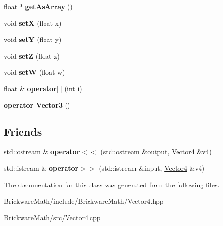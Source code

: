 \begin{DoxyCompactItemize}
\item 
\hypertarget{classBrickware_1_1Math_1_1Vector4_ada3d0cedf10cb6d56429b264495b9bba}{}float $\ast$ {\bfseries get\+As\+Array} ()\label{classBrickware_1_1Math_1_1Vector4_ada3d0cedf10cb6d56429b264495b9bba}

\item 
\hypertarget{classBrickware_1_1Math_1_1Vector4_ae4ce17d214fdb71b1c00d42dc1f54b1b}{}void {\bfseries set\+X} (float x)\label{classBrickware_1_1Math_1_1Vector4_ae4ce17d214fdb71b1c00d42dc1f54b1b}

\item 
\hypertarget{classBrickware_1_1Math_1_1Vector4_a802a9f7987d6589b64dfea11d062a6e9}{}void {\bfseries set\+Y} (float y)\label{classBrickware_1_1Math_1_1Vector4_a802a9f7987d6589b64dfea11d062a6e9}

\item 
\hypertarget{classBrickware_1_1Math_1_1Vector4_a64787391d1a10a6c88e9cf45ad79585b}{}void {\bfseries set\+Z} (float z)\label{classBrickware_1_1Math_1_1Vector4_a64787391d1a10a6c88e9cf45ad79585b}

\item 
\hypertarget{classBrickware_1_1Math_1_1Vector4_ab07082d6f41e5dff3eb1c225a28a4ab0}{}void {\bfseries set\+W} (float w)\label{classBrickware_1_1Math_1_1Vector4_ab07082d6f41e5dff3eb1c225a28a4ab0}

\item 
\hypertarget{classBrickware_1_1Math_1_1Vector4_a2e9c6d075b3253c68e2240099ec2130e}{}float \& {\bfseries operator\mbox{[}$\,$\mbox{]}} (int i)\label{classBrickware_1_1Math_1_1Vector4_a2e9c6d075b3253c68e2240099ec2130e}

\item 
\hypertarget{classBrickware_1_1Math_1_1Vector4_a5690ebea318bfa086450ac02ec02c2b3}{}{\bfseries operator Vector3} ()\label{classBrickware_1_1Math_1_1Vector4_a5690ebea318bfa086450ac02ec02c2b3}

\end{DoxyCompactItemize}
\subsection*{Friends}
\begin{DoxyCompactItemize}
\item 
\hypertarget{classBrickware_1_1Math_1_1Vector4_a0d6bd3fecef79ee6e4275a8efc3dd638}{}std\+::ostream \& {\bfseries operator$<$$<$} (std\+::ostream \&output, \hyperlink{classBrickware_1_1Math_1_1Vector4}{Vector4} \&v4)\label{classBrickware_1_1Math_1_1Vector4_a0d6bd3fecef79ee6e4275a8efc3dd638}

\item 
\hypertarget{classBrickware_1_1Math_1_1Vector4_ab7a5f7f6aed3d08e1ea681b21bea4e13}{}std\+::istream \& {\bfseries operator$>$$>$} (std\+::istream \&input, \hyperlink{classBrickware_1_1Math_1_1Vector4}{Vector4} \&v4)\label{classBrickware_1_1Math_1_1Vector4_ab7a5f7f6aed3d08e1ea681b21bea4e13}

\end{DoxyCompactItemize}


The documentation for this class was generated from the following files\+:\begin{DoxyCompactItemize}
\item 
Brickware\+Math/include/\+Brickware\+Math/Vector4.\+hpp\item 
Brickware\+Math/src/Vector4.\+cpp\end{DoxyCompactItemize}
